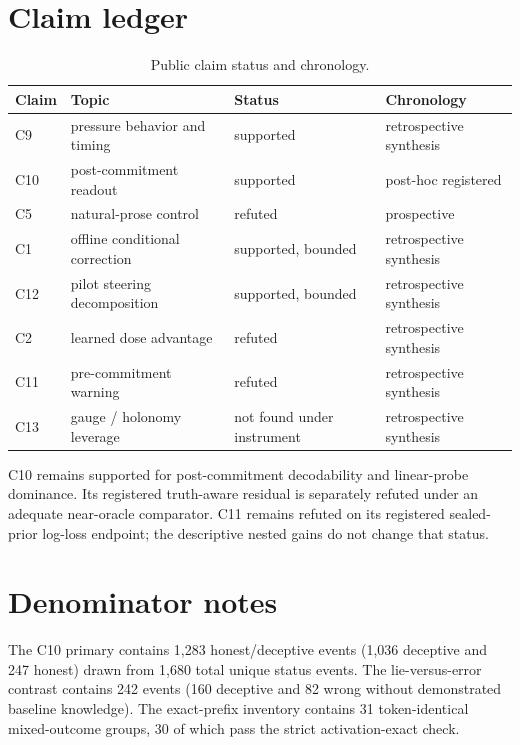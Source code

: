 \section{Claim ledger}

\begin{table}[h]
\caption{Public claim status and chronology.}
\centering
\small
\begin{tabular}{llll}
\toprule
Claim & Topic & Status & Chronology \\
\midrule
C9 & pressure behavior and timing & supported & retrospective synthesis \\
C10 & post-commitment readout & supported & post-hoc registered \\
C5 & natural-prose control & refuted & prospective \\
C1 & offline conditional correction & supported, bounded & retrospective synthesis \\
C12 & pilot steering decomposition & supported, bounded & retrospective synthesis \\
C2 & learned dose advantage & refuted & retrospective synthesis \\
C11 & pre-commitment warning & refuted & retrospective synthesis \\
C13 & gauge / holonomy leverage & not found under instrument & retrospective synthesis \\
\bottomrule
\end{tabular}
\end{table}

C10 remains supported for post-commitment decodability and linear-probe dominance. Its registered
truth-aware residual is separately refuted under an adequate near-oracle comparator. C11 remains
refuted on its registered sealed-prior log-loss endpoint; the descriptive nested gains do not
change that status.

\section{Denominator notes}
\enlargethispage{2\baselineskip}

The C10 primary contains 1,283 honest/deceptive events (1,036 deceptive and 247 honest) drawn from
1,680 total unique status events. The lie-versus-error contrast contains 242 events (160 deceptive
and 82 wrong without demonstrated baseline knowledge). The exact-prefix inventory contains 31
token-identical mixed-outcome groups, 30 of which pass the strict activation-exact check.

